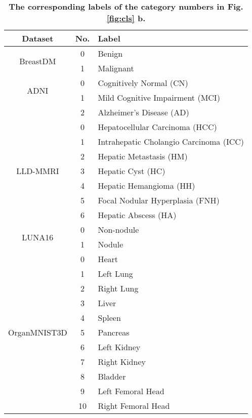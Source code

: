 \begin{table}[!t]
	\centering
	\caption{\textbf{The corresponding labels of the category numbers in Fig. \ref{fig:cls} b.}}
	\label{table:t2} 
	
	\begin{tabular}{ccl}
		\hline
		Dataset & No. & Label \\ \hline
		\multirow{2}[1]{*}{BreastDM} & 0 & Benign \\ 
		~ & 1 & Malignant \\ 
		\hline
		\multirow{2}[1]{*}{ADNI} & 0 & Cognitively Normal (CN) \\ 
		~ & 1 & Mild Cognitive Impairment (MCI) \\ 
		~ & 2 & Alzheimer’s Disease (AD) \\ 
		\hline
		\multirow{7}[1]{*}{LLD-MMRI} & 0 & Hepatocellular Carcinoma (HCC) \\ 
		~ & 1 & Intrahepatic Cholangio Carcinoma (ICC) \\ 
		~ & 2 & Hepatic Metastasis (HM) \\ 
		~ & 3 & Hepatic Cyst (HC) \\ 
		~ & 4 & Hepatic Hemangioma (HH) \\ 
		~ & 5 & Focal Nodular Hyperplasia (FNH) \\ 
		~ & 6 & Hepatic Abscess (HA) \\ 
		\hline
		\multirow{2}[1]{*}{LUNA16} & 0 & Non-nodule \\ 
		~ & 1 & Nodule \\ 
		\hline
		\multirow{11}[1]{*}{OrganMNIST3D} & 0 & Heart \\ 
		~ & 1 & Left Lung \\ 
		~ & 2 &  Right Lung \\ 
		~ & 3 & Liver \\ 
		~ & 4 & Spleen \\ 
		~ & 5 & Pancreas \\ 
		~ & 6 & Left Kidney \\ 
		~ & 7 & Right Kidney \\ 
		~ & 8 & Bladder \\ 
		~ & 9 & Left Femoral Head \\ 
		~ & 10 & Right Femoral Head \\ \hline
	\end{tabular}
\end{table}

